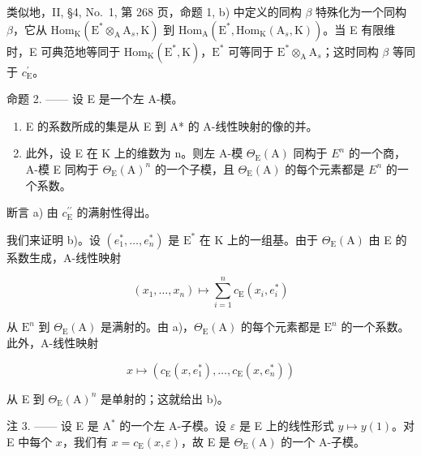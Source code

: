 类似地，II, §4, No.~1, 第 268 页，命题 1, b) 中定义的同构 \(\beta\) 特殊化为一个同构 \(\beta\)，它从 \(\mathrm{Hom}_{\mathrm{K}}(\mathrm{E}^{*}\otimes_{\mathrm{A}}\mathrm{A}_{s},\mathrm{K})\) 到 \(\mathrm{Hom}_{\mathrm{A}}(\mathrm{E}^{*},\mathrm{Hom}_{\mathrm{K}}(\mathrm{A}_{s},\mathrm{K}))\)。当 E 有限维时，E 可典范地等同于 \(\mathrm{Hom}_{\mathrm{K}}(\mathrm{E}^{*},\mathrm{K})\)，\(\mathrm{E}^{*}\) 可等同于 \(\mathrm{E}^{*}\otimes_{\mathrm{A}}\mathrm{A}_{s}\)；这时同构 \(\beta\) 等同于 \(c_{\mathrm{E}}^{\prime}\)。

命题 2. —— 设 E 是一个左 A-模。

\begin{enumerate}
\def\labelenumi{\alph{enumi})}
\item
  E 的系数所成的集是从 E 到 A* 的 A-线性映射的像的并。
\item
  此外，设 E 在 K 上的维数为 n。则左 A-模 \(\Theta_{\mathrm{E}}(\mathrm{A})\) 同构于 \(E^{n}\) 的一个商，A-模 E 同构于 \(\Theta_{\mathrm{E}}(\mathrm{A})^{n}\) 的一个子模，且 \(\Theta_{\mathrm{E}}(\mathrm{A})\) 的每个元素都是 \(E^{n}\) 的一个系数。
\end{enumerate}

断言 a) 由 \(c_{\mathrm{E}}^{\prime \prime}\) 的满射性得出。

我们来证明 b)。设 \((e_1^*,\ldots ,e_n^*)\) 是 \(\mathrm{E}^*\) 在 K 上的一组基。由于 \(\Theta_{\mathrm{E}}(\mathrm{A})\) 由 E 的系数生成，A-线性映射

\[
(x _ {1}, \ldots , x _ {n}) \mapsto \sum_ {i = 1} ^ {n} c _ {\mathrm{E}} (x _ {i}, e _ {i} ^ {*})
\]

从 \(\mathrm{E}^n\) 到 \(\Theta_{\mathrm{E}}(\mathrm{A})\) 是满射的。由 a)，\(\Theta_{\mathrm{E}}(\mathrm{A})\) 的每个元素都是 \(\mathrm{E}^n\) 的一个系数。此外，A-线性映射

\[
x \mapsto \left(c _ {\mathrm{E}} (x, e _ {1} ^ {*}), \ldots , c _ {\mathrm{E}} (x, e _ {n} ^ {*})\right)
\]

从 E 到 \(\Theta_{\mathrm{E}}(\mathrm{A})^{n}\) 是单射的；这就给出 b)。

注 3. —— 设 E 是 \(\mathrm{A}^*\) 的一个左 A-子模。设 \(\varepsilon\) 是 E 上的线性形式 \(y \mapsto y(1)\)。对 E 中每个 \(x\)，我们有 \(x = c_{\mathrm{E}}(x, \varepsilon)\)，故 E 是 \(\Theta_{\mathrm{E}}(\mathrm{A})\) 的一个 A-子模。

